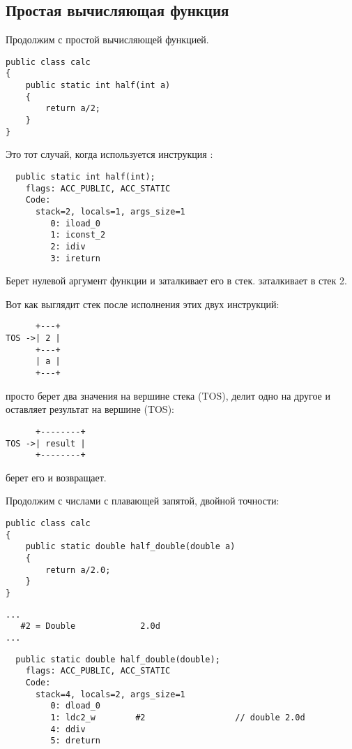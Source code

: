 \subsection{Простая вычисляющая функция}

Продолжим с простой вычисляющей функцией.

\begin{lstlisting}
public class calc
{
	public static int half(int a)
	{
		return a/2;
	}
}
\end{lstlisting}


Это тот случай, когда используется инструкция :

\begin{lstlisting}
  public static int half(int);
    flags: ACC_PUBLIC, ACC_STATIC
    Code:
      stack=2, locals=1, args_size=1
         0: iload_0       
         1: iconst_2      
         2: idiv          
         3: ireturn       
\end{lstlisting}
         
Берет нулевой аргумент функции и заталкивает его в стек.
 заталкивает в стек 2.

Вот как выглядит стек после исполнения этих двух инструкций:

\begin{lstlisting}
      +---+
TOS ->| 2 |
      +---+
      | a |
      +---+
\end{lstlisting}


 просто берет два значения на вершине стека (\ac{TOS}), 
делит одно на другое и оставляет результат на вершине (\ac{TOS}):

\begin{lstlisting}
      +--------+
TOS ->| result |
      +--------+
\end{lstlisting}

 берет его и возвращает.


Продолжим с числами с плавающей запятой, двойной точности:

\begin{lstlisting}
public class calc
{
	public static double half_double(double a)
	{
		return a/2.0;
	}
}
\end{lstlisting}

\begin{lstlisting}[caption=Constant pool]
...
   #2 = Double             2.0d
...
\end{lstlisting}

\begin{lstlisting}
  public static double half_double(double);
    flags: ACC_PUBLIC, ACC_STATIC
    Code:
      stack=4, locals=2, args_size=1
         0: dload_0       
         1: ldc2_w        #2                  // double 2.0d
         4: ddiv          
         5: dreturn       
\end{lstlisting}


